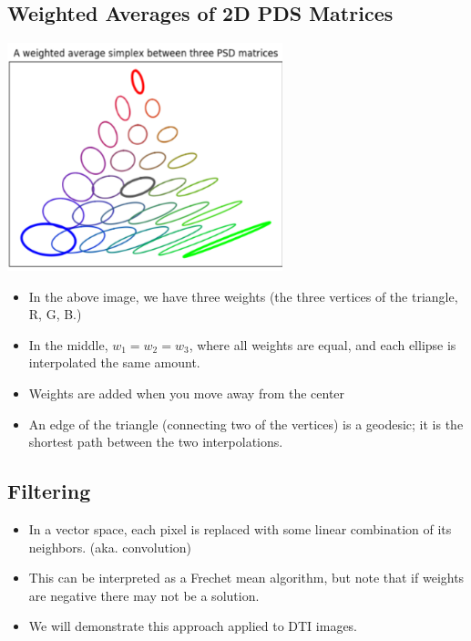 \documentclass[10pt]{article}
\begin{document}
\subsection*{Weighted Averages of 2D PDS Matrices}
\begin{center} 
	\includegraphics*[width=0.6\textwidth]{W10_1.png} 
\end{center}
\begin{itemize}
	\item In the above image, we have three weights (the three vertices of the triangle, R, G, B.)
	\item In the middle, $w_1 = w_2 = w_3$, where all weights are equal, and each ellipse is interpolated the same amount.
	\item Weights are added when you move away from the center
	\item An edge of the triangle (connecting two of the vertices) is a geodesic; it is the shortest path between the two interpolations.
\end{itemize}

\subsection*{Filtering}
\begin{itemize}
	\item In a vector space, each pixel is replaced with some linear combination of its neighbors.  (aka. convolution)
	\item This can be interpreted as a Frechet mean algorithm, but note that if weights are negative there may not be a solution.
	\item We will demonstrate this approach applied to DTI images.
\end{itemize}
\end{document}
